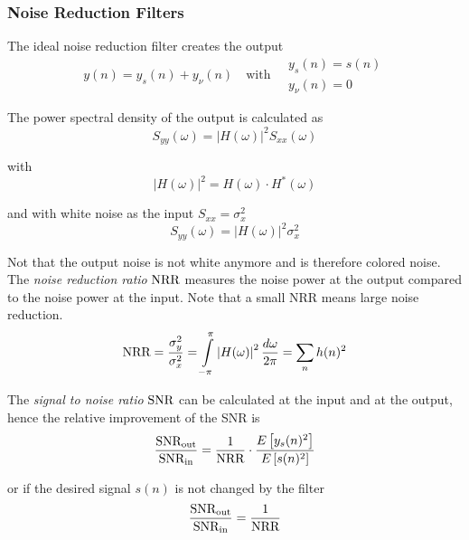 \subsubsection{Noise Reduction Filters}

The ideal noise reduction filter creates the output
\begin{equation*}
	y(n) = y_s(n) + y_{\nu}(n) \quad \text{with} \quad
		\begin{array}{l}
		y_s(n) = s(n) \\
		y_{\nu}(n) = 0
		\end{array}
\end{equation*}

The power spectral density of the output is calculated as
\begin{equation*}
	S_{yy}(\omega) = \left| H(\omega) \right|^2 S_{xx}(\omega)
\end{equation*}

with
\begin{equation*}
	\left| H(\omega) \right|^2 = H(\omega) \cdot H^*(\omega)
\end{equation*}

and with white noise as the input $S_{xx} = \sigma_x^2$
\begin{equation*}
	S_{yy}(\omega) = \left| H(\omega) \right|^2 \sigma_x^2
\end{equation*}

Not that the output noise is not white anymore and is therefore colored noise. \\

The \emph{noise reduction ratio} $\operatorname{\text{NRR}}$ measures the noise power at the output
compared to the noise power at the input. Note that a small NRR means
large noise reduction.
\begin{equation*}
	\operatorname{\text{NRR}} = \frac{\sigma_y^2}{\sigma_x^2}
		 = \int\limits_{-\pi}^{\pi} \left| H(\omega) \right|^2 \frac{d\omega}{2\pi}
		 = \sum\limits_{n} h(n)^2
\end{equation*}

The \emph{signal to noise ratio} $\operatorname{\text{SNR}}$ can be calculated at the input and
at the output, hence the relative improvement of the SNR is
\begin{equation*}
	\frac{\operatorname{\text{SNR}}_{\text{out}}}{\operatorname{\text{SNR}}_{\text{in}}} = \frac{1}{\operatorname{\text{NRR}}} \cdot \frac{E\left[y_s(n)^2\right]}{E\left[s(n)^2\right]}
\end{equation*}

or if the desired signal $s(n)$ is not changed by the filter
\begin{equation*}
	\frac{\operatorname{\text{SNR}}_{\text{out}}}{\operatorname{\text{SNR}}_{\text{in}}} = \frac{1}{\operatorname{\text{NRR}}}
\end{equation*}

